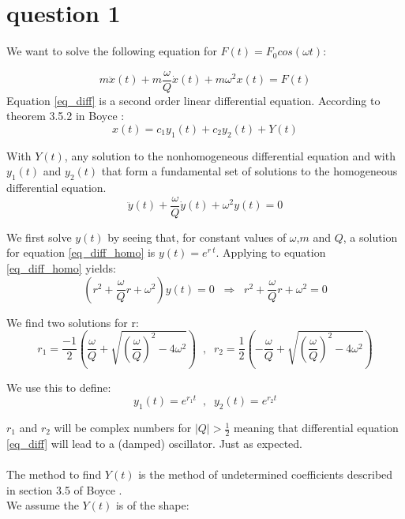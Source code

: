\section{question 1}

We want to solve the following equation for $F(t) = F_0 cos(\omega t)$:

\begin{equation}
	\label{eq_diff}
	m \ddot{x}(t) + m \frac{\omega}{Q} \dot{x}(t) + m \omega^2 x(t) = F(t)
\end{equation}
Equation \ref{eq_diff} is a second order linear differential equation. According to theorem 3.5.2 in Boyce \cite{Boyce}:
\begin{equation}
	\label{eq_x_1_emtpy}
	x(t) = c_1 y_1(t) + c_2 y_2(t) + Y(t)
\end{equation}

With $Y(t)$, any solution to the nonhomogeneous differential equation and with $y_1(t)$ and $y_2(t)$ that form a fundamental set of solutions to the homogeneous differential equation.
\begin{equation}
	\label{eq_diff_homo}
	\ddot{y}(t) + \frac{\omega}{Q} \dot{y}(t) + \omega^2 y(t) = 0
\end{equation}

We first solve $y(t)$ by seeing that, for constant values of $\omega$,$m$ and $Q$, a solution for equation \ref{eq_diff_homo} is  $y(t) = e^{r \: t}$. Applying to equation \ref{eq_diff_homo} yields:
\begin{equation}
	\label{eq_characteristic}
	(r^2 + \frac{\omega}{Q} r + \omega^2) y(t) = 0 \; \; \Rightarrow \; \; r^2 + \frac{\omega}{Q} r + \omega^2 = 0
\end{equation}

We find two solutions for r:
\begin{equation*}
	r_1 = \frac{-1}{2} \left( \frac{\omega}{Q} + \sqrt{\left( \frac{\omega}{Q} \right)^2 -4 \omega^2} \right) \; \; , \; \; r_2 = \frac{1}{2} \left( -\frac{\omega}{Q} + \sqrt{\left( \frac{\omega}{Q} \right)^2 -4 \omega^2} \right)
\end{equation*}

We use this to define:
\begin{equation*}
y_1(t) = e^{r_1 t} \; \; , \; \; y_2(t) = e^{r_2 t}
\end{equation*}

$r_1$ and $r_2$ will be complex numbers for $\mid Q \mid > \frac{1}{2}$ meaning that differential equation \ref{eq_diff} will lead to a (damped) oscillator. Just as expected.\\
\\
The method to find $Y(t)$ is the method of undetermined coefficients described in section 3.5 of Boyce \cite{boyce}.\\
We assume the $Y(t)$ is of the shape:

